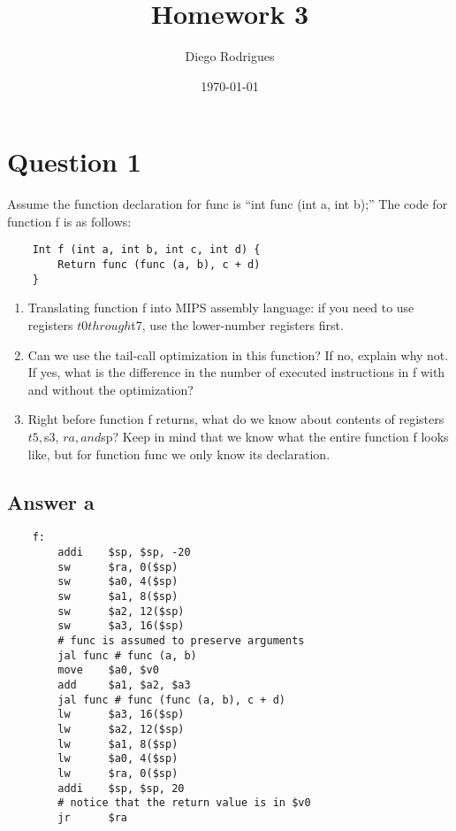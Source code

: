 \documentclass{article}
\title{Homework 3}
\author{Diego Rodrigues}
\date{\today}
\begin{document}
\maketitle

\section{Question 1}

Assume the function declaration for func is “int func (int a, int b);” The code for function f is as
follows:
\begin{verbatim}
    Int f (int a, int b, int c, int d) {
        Return func (func (a, b), c + d)
    }
\end{verbatim}

\begin{enumerate}
    \item Translating function f into MIPS assembly language: if you need to use registers $t0 through $t7, use the lower-number registers first.
    \item Can we use the tail-call optimization in this function? If no, explain why not. If yes, what is the difference in the number of executed instructions in f with and without the optimization?
    \item Right before function f returns, what do we know about contents of registers $t5, $s3, $ra, and $sp? Keep in mind that we know what the entire function f looks like, but for function func we only know its declaration.
\end{enumerate}

\subsection{Answer a}
    
\begin{verbatim}
    f:
        addi    $sp, $sp, -20
        sw      $ra, 0($sp)
        sw      $a0, 4($sp)
        sw      $a1, 8($sp)
        sw      $a2, 12($sp)
        sw      $a3, 16($sp)
        # func is assumed to preserve arguments
        jal func # func (a, b) 
        move    $a0, $v0
        add     $a1, $a2, $a3
        jal func # func (func (a, b), c + d)
        lw      $a3, 16($sp)
        lw      $a2, 12($sp)
        lw      $a1, 8($sp)
        lw      $a0, 4($sp)
        lw      $ra, 0($sp)
        addi    $sp, $sp, 20
        # notice that the return value is in $v0
        jr      $ra
\end{verbatim}
\end{document}
